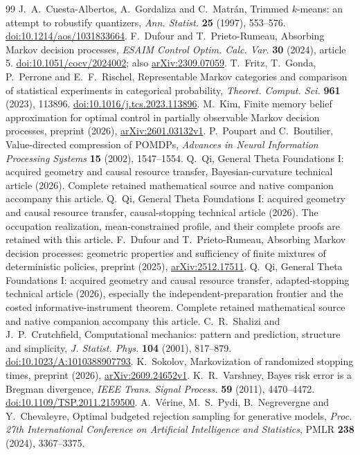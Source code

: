 \begin{thebibliography}{99}
 J.~A.~Cuesta-Albertos, A.~Gordaliza and C.~Matr\'an, Trimmed $k$-means: an attempt to robustify quantizers, \emph{Ann. Statist.} \textbf{25} (1997), 553--576. \href{https://doi.org/10.1214/aos/1031833664}{doi:10.1214/aos/1031833664}.
 F.~Dufour and T.~Prieto-Rumeau, Absorbing Markov decision processes, \emph{ESAIM Control Optim. Calc. Var.} \textbf{30} (2024), article 5. \href{https://doi.org/10.1051/cocv/2024002}{doi:10.1051/cocv/2024002}; also \href{https://arxiv.org/abs/2309.07059}{arXiv:2309.07059}.
 T.~Fritz, T.~Gonda, P.~Perrone and E.~F.~Rischel, Representable Markov categories and comparison of statistical experiments in categorical probability, \emph{Theoret. Comput. Sci.} \textbf{961} (2023), 113896. \href{https://doi.org/10.1016/j.tcs.2023.113896}{doi:10.1016/j.tcs.2023.113896}.
 M.~Kim, Finite memory belief approximation for optimal control in partially observable Markov decision processes, preprint (2026), \href{https://arxiv.org/abs/2601.03132v1}{arXiv:2601.03132v1}.
 P.~Poupart and C.~Boutilier, Value-directed compression of POMDPs, \emph{Advances in Neural Information Processing Systems} \textbf{15} (2002), 1547--1554.
 Q.~Qi, General Theta Foundations I: acquired geometry and causal resource transfer, Bayesian-curvature technical article (2026). Complete retained mathematical source and native companion accompany this article.
 Q.~Qi, General Theta Foundations I: acquired geometry and causal resource transfer, causal-stopping technical article (2026). The occupation realization, mean-constrained profile, and their complete proofs are retained with this article.
 F.~Dufour and T.~Prieto-Rumeau, Absorbing Markov decision processes: geometric properties and sufficiency of finite mixtures of deterministic policies, preprint (2025), \href{https://arxiv.org/abs/2512.17511}{arXiv:2512.17511}.
 Q.~Qi, General Theta Foundations I: acquired geometry and causal resource transfer, adapted-stopping technical article (2026), especially the independent-preparation frontier and the costed informative-instrument theorem. Complete retained mathematical source and native companion accompany this article.
 C.~R.~Shalizi and J.~P.~Crutchfield, Computational mechanics: pattern and prediction, structure and simplicity, \emph{J. Statist. Phys.} \textbf{104} (2001), 817--879. \href{https://doi.org/10.1023/A:1010388907793}{doi:10.1023/A:1010388907793}.
 K.~Sokolov, Markovization of randomized stopping times, preprint (2026), \href{https://arxiv.org/abs/2609.24652v1}{arXiv:2609.24652v1}.
 K.~R.~Varshney, Bayes risk error is a Bregman divergence, \emph{IEEE Trans. Signal Process.} \textbf{59} (2011), 4470--4472. \href{https://doi.org/10.1109/TSP.2011.2159500}{doi:10.1109/TSP.2011.2159500}.
 A.~V\'erine, M.~S.~Pydi, B.~Negrevergne and Y.~Chevaleyre, Optimal budgeted rejection sampling for generative models, \emph{Proc. 27th International Conference on Artificial Intelligence and Statistics}, PMLR \textbf{238} (2024), 3367--3375.
\end{thebibliography}
